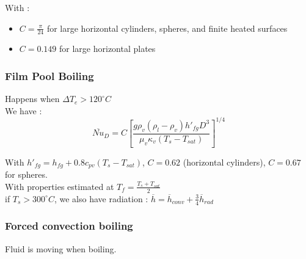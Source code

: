 \documentclass[../main.tex]{subfiles}
\begin{document}
With : \begin{itemize}
\item $C = \frac{\pi}{24}$ for large horizontal cylinders, spheres, and finite heated surfaces\\
\item $C = 0.149$ for large horizontal plates\\
\end{itemize}

\subsubsection{Film Pool Boiling}
Happens when $\Delta T_e > 120^\circ C$\\

We have : \begin{equation}
    \overline{Nu}_D = C[\frac{g \rho_v (\rho_l-\rho_v) h'_{fg} D^3}{\mu_v \kappa_v (T_s-T_{sat})}]^{1/4}
\end{equation}

With $h'_{fg} = h_{fg} + 0.8 c_{pv} (T_s-T_{sat})$, $C = 0.62$ (horizontal cylinders), $C = 0.67$ for spheres.\\

With properties estimated at $T_f = \frac{T_s+T_{sat}}{2}$\\

if $T_s>300^\circ C$, we also have radiation : $\overline{h} = \overline{h}_{conv} + \frac{3}{4} \overline{h}_{rad}$\\

\subsubsection{Forced convection boiling}
Fluid is moving when boiling.\\
\end{document}
